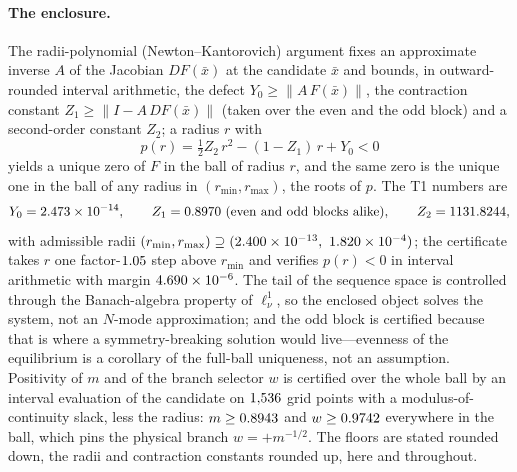\documentclass[11pt]{article}
\newcommand{\lnu}{\ell^1_\nu}
\begin{document}
\paragraph{The enclosure.}
The radii-polynomial (Newton--Kantorovich) argument \cite{vdBL} fixes an
approximate inverse $A$ of the Jacobian $DF(\bar x)$ at the candidate $\bar x$
and bounds, in outward-rounded interval arithmetic, the defect
$Y_0\ge\|A\,F(\bar x)\|$, the contraction constant $Z_1\ge\|I-A\,DF(\bar x)\|$
(taken over the even and the odd block) and a second-order constant $Z_2$; a
radius $r$ with
\begin{equation}\label{eq:radii}
p(r)=\tfrac12 Z_2\,r^2-(1-Z_1)\,r+Y_0<0
\end{equation}
yields a unique zero of $F$ in the ball of radius $r$, and the same zero is the
unique one in the ball of any radius in $(r_{\min},r_{\max})$, the roots of
$p$. The T1 numbers are
\[
Y_0=2.473\times10^{-14},\qquad
Z_1=0.8970\ \text{(even and odd blocks alike)},\qquad
Z_2=1131.8244,
\]
with admissible radii $(r_{\min},r_{\max})\supseteq(\TOneRMin,\ \TOneRMax)$;
the certificate takes $r$ one factor-$1.05$ step above $r_{\min}$ and
verifies $p(r)<0$ in interval arithmetic with margin $4.690\times10^{-6}$. The tail
of the sequence space is controlled through the Banach-algebra property of
$\lnu$, so the enclosed object solves the system, not an $N$-mode
approximation; and the odd block is certified because that is where a
symmetry-breaking solution would live---evenness of the equilibrium is a
corollary of the full-ball uniqueness, not an assumption. Positivity of $m$ and
of the branch selector $w$ is certified over the whole ball by an interval
evaluation of the candidate on $1{,}536$ grid points with a
modulus-of-continuity slack, less the radius: $m\ge0.8943$ and
$w\ge0.9742$ everywhere in the ball, which pins the physical branch
$w=+m^{-1/2}$. The floors are stated rounded down, the radii and contraction
constants rounded up, here and throughout.
\end{document}
